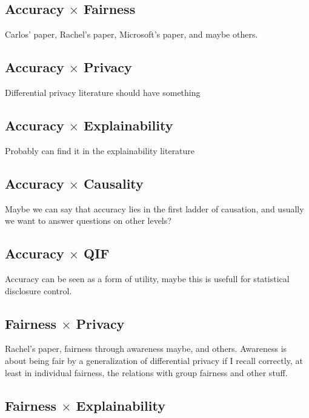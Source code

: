 \subsection{Accuracy $\times$ Fairness}

{\color{red}Carlos' paper, Rachel's paper, Microsoft's paper, and maybe others.}

\subsection{Accuracy $\times$ Privacy}

{\color{red} Differential privacy literature should have something}

\subsection{Accuracy $\times$ Explainability}

{\color{red} Probably can find it in the explainability literature}

\subsection{Accuracy $\times$ Causality}

{\color{red} Maybe we can say that accuracy lies in the first ladder of causation, and usually we want to answer questions on other levels?}

\subsection{Accuracy $\times$ QIF}

{\color{red} Accuracy can be seen as a form of utility, maybe this is usefull for statistical disclosure control.}

\subsection{Fairness $\times$ Privacy}

{\color{red} Rachel's paper, fairness through awareness maybe, and others. Awareness is about being fair by a generalization of differential privacy if I recall correctly, at least in individual fairness, the relations with group fairness and other stuff.}

\subsection{Fairness $\times$ Explainability}

